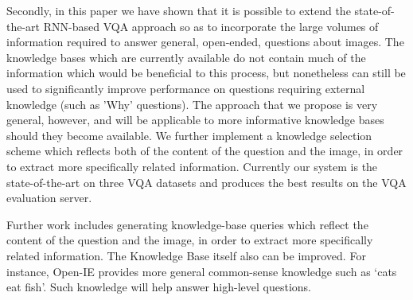 \documentclass[10pt,journal,compsoc]{IEEEtran}
\begin{document}
Secondly, in this paper we have shown that it is possible to extend the state-of-the-art RNN-based VQA approach so as to incorporate the large volumes of information required to answer general, open-ended, questions about images. The knowledge bases which are currently available do not contain much of the information which would be beneficial to this process, but nonetheless can still be used to significantly improve performance on questions requiring external knowledge (such as 'Why' questions).  The approach that we propose is very general, however, and will be applicable to more informative knowledge bases should they become available. We further implement a knowledge selection scheme which reflects both of the content of the question and the image, in order to extract more specifically related information. Currently our system is the state-of-the-art on three VQA datasets and produces the best results on the VQA evaluation server.

Further work includes generating knowledge-base queries which reflect the content of the question and the image, in order to extract more specifically related information. The Knowledge Base itself also can be improved. For instance, Open-IE provides more general common-sense knowledge such as `cats eat fish'. Such knowledge will help answer high-level questions.

%
%
%
%
%
%
%
%
%
%
%
%
%
%
%
%
%
%
%
%
%
%
%
%
\end{document}
